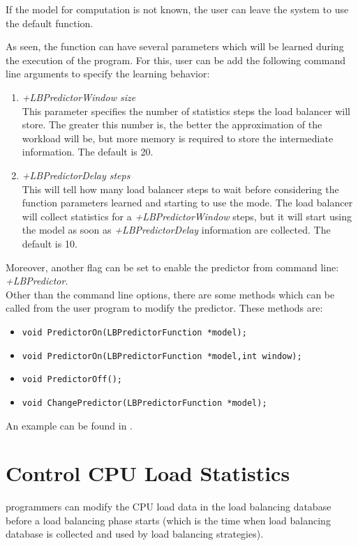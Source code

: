 If the model for computation is not known, the user can leave the system to
use the default function.

As seen, the function can have several parameters which will be learned during
the execution of the program. For this, user can be add the following command
line arguments to specify the learning behavior:
\begin{enumerate}
\item {\em +LBPredictorWindow size}\\
This parameter specifies the number of statistics steps the load balancer will
store.  The greater this number is, the better the
approximation of the workload will be, but more memory is required to store
the intermediate information. The default is 20.
\item {\em +LBPredictorDelay steps}\\
This will tell how many load balancer steps to wait before considering the
function parameters learned and starting to use the mode. The load balancer will
collect statistics for a {\em +LBPredictorWindow} steps, but it will start using
the model as soon as {\em +LBPredictorDelay} information are collected. The
default is 10.
\end{enumerate}
Moreover, another flag can be set to enable the predictor from command line: {\em
+LBPredictor}.\\
Other than the command line options, there are some methods
which can be called from the user program to modify the predictor. These methods are:
\begin{itemize}
\item {\tt void PredictorOn(LBPredictorFunction *model);}
\item {\tt void PredictorOn(LBPredictorFunction *model,int window);}
\item {\tt void PredictorOff();}
\item {\tt void ChangePredictor(LBPredictorFunction *model);}
\end{itemize}

An example can be found in .
\section{Control CPU Load Statistics}

\charmpp{} programmers can modify the CPU load data in the load balancing database
before a load balancing phase starts (which is the time when load balancing
database is collected and used by load balancing strategies).

